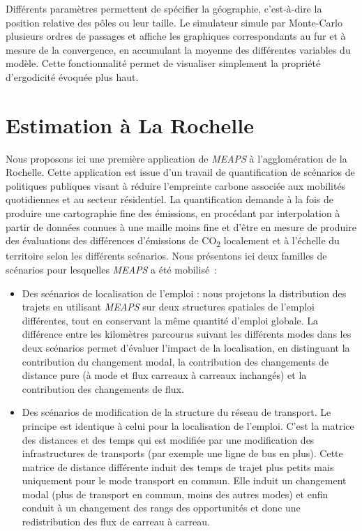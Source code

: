 \documentclass[
  10pt,
  a4paper,
  numbers=noendperiod,
  DIV=9]{scrartcl}
\begin{document}
Différents paramètres permettent de spécifier la géographie,
c'est-à-dire la position relative des pôles ou leur taille. Le
simulateur simule par Monte-Carlo plusieurs ordres de passages et
affiche les graphiques correspondants au fur et à mesure de la
convergence, en accumulant la moyenne des différentes variables du
modèle. Cette fonctionnalité permet de visualiser simplement la
propriété d'ergodicité évoquée plus haut.


\hypertarget{sec-rochelle}{%
\chapter{Estimation à La Rochelle}\label{sec-rochelle}}

Nous proposons ici une première application de \emph{MEAPS} à
l'agglomération de la Rochelle. Cette application est issue d'un travail
de quantification de scénarios de politiques publiques visant à réduire
l'empreinte carbone associée aux mobilités quotidiennes et au secteur
résidentiel. La quantification demande à la fois de produire une
cartographie fine des émissions, en procédant par interpolation à partir
de données connues à une maille moins fine et d'être en mesure de
produire des évaluations des différences d'émissions de
CO\textsubscript{2} localement et à l'échelle du territoire selon les
différents scénarios. Nous présentons ici deux familles de scénarios
pour lesquelles \emph{MEAPS} a été mobilisé~:

\begin{itemize}
\item
  Des scénarios de localisation de l'emploi : nous projetons la
  distribution des trajets en utilisant \emph{MEAPS} sur deux structures
  spatiales de l'emploi différentes, tout en conservant la même quantité
  d'emploi globale. La différence entre les kilomètres parcourus suivant
  les différents modes dans les deux scénarios permet d'évaluer l'impact
  de la localisation, en distinguant la contribution du changement
  modal, la contribution des changements de distance pure (à mode et
  flux carreaux à carreaux inchangés) et la contribution des changements
  de flux.
\item
  Des scénarios de modification de la structure du réseau de transport.
  Le principe est identique à celui pour la localisation de l'emploi.
  C'est la matrice des distances et des temps qui est modifiée par une
  modification des infrastructures de transports (par exemple une ligne
  de bus en plus). Cette matrice de distance différente induit des temps
  de trajet plus petits mais uniquement pour le mode transport en
  commun. Elle induit un changement modal (plus de transport en commun,
  moins des autres modes) et enfin conduit à un changement des rangs des
  opportunités et donc une redistribution des flux de carreau à carreau.
\end{itemize}
\end{document}
